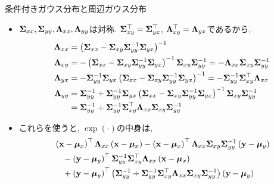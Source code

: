 \documentclass[dvipdfmx,notheorems,t]{beamer}
\begin{document}
\begin{frame}{条件付きガウス分布と周辺ガウス分布}
\begin{itemize}
  \item $\vb{\Sigma}_{xx}, \vb{\Sigma}_{yy}, \vb{\Lambda}_{xx}, \vb{\Lambda}_{yy}$は対称.
  $\vb{\Sigma}_{xy}^\top = \vb{\Sigma}_{yx}^\top$,
  $\vb{\Lambda}_{xy}^\top = \vb{\Lambda}_{yx}$であるから,
  \begin{align*}
    \vb{\Lambda}_{xx} &= \left(
      \vb{\Sigma}_{xx} - \vb{\Sigma}_{xy} \vb{\Sigma}_{yy}^{-1} \vb{\Sigma}_{yx} \right)^{-1} \\
    \vb{\Lambda}_{xy} &= -\left(
      \vb{\Sigma}_{xx} - \vb{\Sigma}_{xy} \vb{\Sigma}_{yy}^{-1} \vb{\Sigma}_{yx} \right)^{-1}
      \vb{\Sigma}_{xy} \vb{\Sigma}_{yy}^{-1} = -\vb{\Lambda}_{xx} \vb{\Sigma}_{xy} \vb{\Sigma}_{yy}^{-1} \\
    \vb{\Lambda}_{yx} &= -\vb{\Sigma}_{yy}^{-1} \vb{\Sigma}_{yx} \left(
      \vb{\Sigma}_{xx} - \vb{\Sigma}_{xy} \vb{\Sigma}_{yy}^{-1} \vb{\Sigma}_{yx} \right)^{-1}
      = -\vb{\Sigma}_{yy}^{-1} \vb{\Sigma}_{xy}^\top \vb{\Lambda}_{xx} \\
    \vb{\Lambda}_{yy} &= \vb{\Sigma}_{yy}^{-1} + \vb{\Sigma}_{yy}^{-1} \vb{\Sigma}_{yx} \left(
      \vb{\Sigma}_{xx} - \vb{\Sigma}_{xy} \vb{\Sigma}_{yy}^{-1} \vb{\Sigma}_{yx} \right)^{-1}
      \vb{\Sigma}_{xy} \vb{\Sigma}_{yy}^{-1} \\
    &= \vb{\Sigma}_{yy}^{-1} + \vb{\Sigma}_{yy}^{-1} \vb{\Sigma}_{xy}^\top \vb{\Lambda}_{xx}
      \vb{\Sigma}_{xy} \vb{\Sigma}_{yy}^{-1}
  \end{align*}
  \item これらを使うと, $\exp(\cdot)$の中身は,
  \begin{align*}
    & \left( \vb{x} - \vb*{\mu}_x \right)^\top \vb{\Lambda}_{xx}
      \left( \vb{x} - \vb*{\mu}_x \right)
      - \left( \vb{x} - \vb*{\mu}_x \right)^\top
      \vb{\Lambda}_{xx} \vb{\Sigma}_{xy} \vb{\Sigma}_{yy}^{-1}
      \left( \vb{y} - \vb*{\mu}_y \right) \\
    & \quad - \left( \vb{y} - \vb*{\mu}_y \right)^\top
      \vb{\Sigma}_{yy}^{-1} \vb{\Sigma}_{xy}^\top \vb{\Lambda}_{xx}
      \left( \vb{x} - \vb*{\mu}_x \right) \\
    & \quad + \left( \vb{y} - \vb*{\mu}_y \right)^\top
      \left( \vb{\Sigma}_{yy}^{-1} + \vb{\Sigma}_{yy}^{-1} \vb{\Sigma}_{xy}^\top
      \vb{\Lambda}_{xx} \vb{\Sigma}_{xy} \vb{\Sigma}_{yy}^{-1} \right)
      \left( \vb{y} - \vb*{\mu}_y \right)
  \end{align*}
\end{itemize}
\end{frame}
\end{document}
